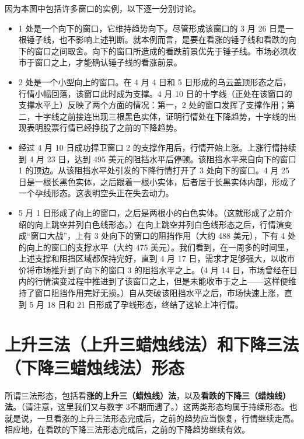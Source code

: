 因为本图中包括许多窗口的实例，以下逐一分别讨论。
\begin{itemize}
    \item 1 处是一个向下的窗口，它维持趋势向下。尽管形成该窗口的 3 月 26 日是一根锤子线，也不影响上述判断。就本例而言，是要在看涨的锤子线和看跌的向下的窗口之间取舍。向下的窗口所造成的看跌前景优先于锤子线。市场必须收市于窗口之上，才能确认锤子线的看涨前景。
    \item 2 处是一个小型向上的窗口。在 4 月 4 日和 5 日形成的乌云盖顶形态之后，行情小幅回落，该窗口此时成为支撑。4 月 10 日的十字线（正处在该窗口的支撑水平上）反映了两个方面的情况：第一，2 处的窗口发挥了支撑作用；第二，十字线之前接连出现三根黑色实体，证明行情处在下降趋势，十字线的出现表明股票行情已经挣脱了之前的下降趋势。
    \item 经过 4 月 10 日成功捍卫窗口 2 的支撑作用后，行情开始上涨。上涨行情持续到 4 月 23 日，达到 495 美元的阻挡水平后停顿。该阻挡水平来自向下的窗口 1 的顶边。从该阻挡水平处引发的下降行情打开了 3 处向下的窗口。4 月 25 日是一根长黑色实体，之后跟着一根小实体，后者居于长黑实体内部，形成了一个孕线形态。这表明空头正在失去动力。
    \item 5 月 1 日形成了向上的窗口，之后是两根小的白色实体。（这就形成了之前介绍的向上跳空并列白色线形态。）在向上跳空并列白色线形态之后，行情演变成“窗口大战”，上有 3 处向下的窗口的阻挡作用（大约 488 美元），下有 4 处的向上的窗口的支撑水平（大约 475 美元）。我们看到，在一周多的时间里，上述支撑和阻挡区域都保持完好，直到 4 月 17 日，需求才足够强大，以收市价将市场推升到了向下的窗口 3 的阻挡水平之上。（4 月 14 日，市场曾经在日内的行情演变过程中推进到了该窗口之上，但是未能收市于之上——这样便维持了窗口阻挡作用完好无损。）自从突破该阻挡水平之后，市场快速上涨，直到 5 月 18 日和 21 日形成了孕线形态，终结了这轮上冲行情。
\end{itemize}
\section{上升三法（上升三蜡烛线法）和下降三法（下降三蜡烛线法）形态}
所谓三法形态，包括看\textbf{涨的上升三（蜡烛线）法}，以及\textbf{看跌的下降三（蜡烛线）法}。（请注意，这里我们又与数字 3不期而遇了。）这两类形态均属于持续形态。也就是说，一旦看涨的上升三法形态完成后，之前的趋势应当恢复，行情继续走高。相应地，在看跌的下降三法形态完成后，之前的下降趋势继续有效。

